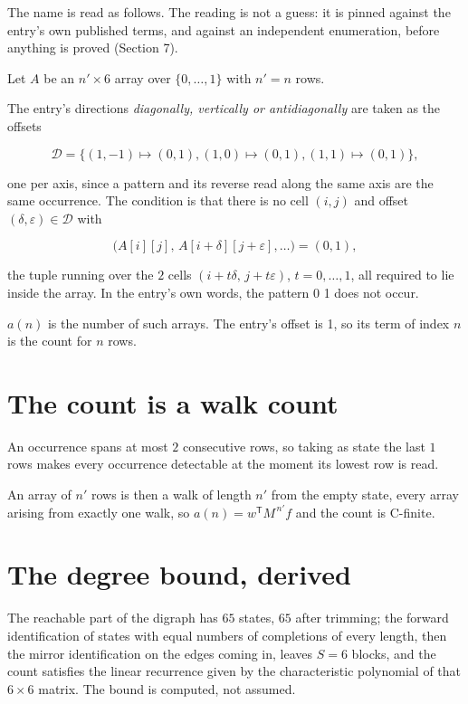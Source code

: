 \documentclass[11pt]{article}
\theoremstyle{definition}
\begin{document}
The name is read as follows. The reading is not a guess: it is pinned against the entry's own published terms, and against an independent enumeration, before anything is proved (Section 7).

Let $A$ be an $n' \times 6$ array over $\{0,\dots,1\}$ with $n' = n$ rows.

The entry's directions {\itshape diagonally, vertically or antidiagonally} are taken as the offsets

\[\mathcal{D} = \{(1,-1)\mapsto(0,1), (1,0)\mapsto(0,1), (1,1)\mapsto(0,1)\},\]

one per axis, since a pattern and its reverse read along the same axis are the same occurrence. The condition is that there is no cell $(i,j)$ and offset $(\delta,\varepsilon)\in\mathcal{D}$ with

\[\bigl(A[i][j],\,A[i{+}\delta][j{+}\varepsilon],\dots\bigr) = (0, 1),\]

the tuple running over the $2$ cells $(i+t\delta,\,j+t\varepsilon)$, $t = 0,\dots,1$, all required to lie inside the array. In the entry's own words, the pattern 0 1 does not occur.

$a(n)$ is the number of such arrays. The entry's offset is 1, so its term of index $n$ is the count for $n$ rows.

\section{The count is a walk count}

An occurrence spans at most $2$ consecutive rows, so taking as state the last $1$ rows makes every occurrence detectable at the moment its lowest row is read.

An array of $n'$ rows is then a walk of length $n'$ from the empty state, every array arising from exactly one walk, so $a(n) = w^{\mathsf T}M^{\,n'}f$ and the count is C-finite.

\section{The degree bound, derived}

The reachable part of the digraph has $65$ states, $65$ after trimming; the forward identification of states with equal numbers of completions of every length, then the mirror identification on the edges coming in, leaves $S = 6$ blocks, and the count satisfies the linear recurrence given by the characteristic polynomial of that $6\times6$ matrix. The bound is computed, not assumed.
\end{document}
